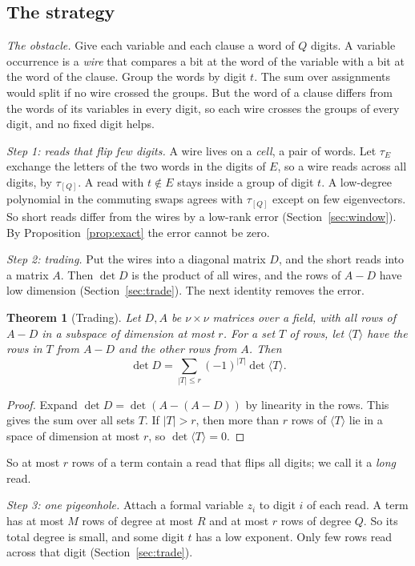 \documentclass[11pt]{article}
\numberwithin{equation}{section}
\newtheorem{theorem}{Theorem}[section]
\theoremstyle{remark}
\begin{document}
\subsection{The strategy}\label{sec:strategy}

\emph{The obstacle.} Give each variable and each clause a word of $Q$ digits. A variable occurrence is a \emph{wire} that compares a bit at the word of the variable with a bit at the word of the clause. Group the words by digit $t$. The sum over assignments would split if no wire crossed the groups. But the word of a clause differs from the words of its variables in every digit, so each wire crosses the groups of every digit, and no fixed digit helps.

\emph{Step 1: reads that flip few digits.} A wire lives on a \emph{cell}, a pair of words. Let $\tau_E$ exchange the letters of the two words in the digits of $E$, so a wire reads across all digits, by $\tau_{[Q]}$. A read with $t\notin E$ stays inside a group of digit $t$. A low-degree polynomial in the commuting swaps agrees with $\tau_{[Q]}$ except on few eigenvectors. So short reads differ from the wires by a low-rank error (Section~\ref{sec:window}). By Proposition~\ref{prop:exact} the error cannot be zero.

\emph{Step 2: trading.} Put the wires into a diagonal matrix $D$, and the short reads into a matrix $A$. Then $\det D$ is the product of all wires, and the rows of $A-D$ have low dimension (Section~\ref{sec:trade}). The next identity removes the error.

\begin{theorem}[Trading]\label{thm:trade}
Let $D,A$ be $\nu\times\nu$ matrices over a field, with all rows of $A-D$ in a subspace of dimension at most $r$. For a set $T$ of rows, let $\langle T\rangle$ have the rows in $T$ from $A-D$ and the other rows from $A$. Then
\[
\det D=\sum_{|T|\le r}(-1)^{|T|}\det\langle T\rangle.
\]
\end{theorem}
\begin{proof}
Expand $\det D=\det(A-(A-D))$ by linearity in the rows. This gives the sum over all sets $T$. If $|T|>r$, then more than $r$ rows of $\langle T\rangle$ lie in a space of dimension at most $r$, so $\det\langle T\rangle=0$.
\end{proof}

So at most $r$ rows of a term contain a read that flips all digits; we call it a \emph{long} read.

\emph{Step 3: one pigeonhole.} Attach a formal variable $z_i$ to digit $i$ of each read. A term has at most $M$ rows of degree at most $R$ and at most $r$ rows of degree $Q$. So its total degree is small, and some digit $t$ has a low exponent. Only few rows read across that digit (Section~\ref{sec:trade}).
\end{document}

